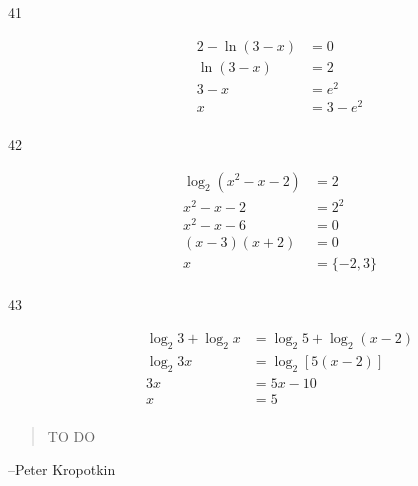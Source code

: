 \documentclass{exam}
\begin{document}
\begin{description}
      \item[41] 
        \begin{align*}
          2 - \ln(3 - x) &= 0 \\
          \ln(3 - x)     &= 2 \\
          3 - x          &= e^2 \\
          x              &= \boxed{3 - e^2} \\
        \end{align*}

      \item[42] 
        \begin{align*}
          \log_2(x^2 - x - 2) &= 2 \\
          x^2 - x - 2         &= 2^2 \\
          x^2 - x - 6         &= 0 \\
          (x - 3)(x + 2)      &= 0 \\
          x                   &= \boxed{\{ - 2, 3\}} \\
        \end{align*}

      \item[43] 
        \begin{align*}
          \log_2 3 + \log_2 x &= \log_2 5 + \log_2(x - 2) \\
          \log_2 3x           &= \log_2 [5 (x - 2)] \\
          3x                  &= 5x - 10 \\
          x                   &= \boxed{5} \\
        \end{align*}

    \end{description}

  \else
    \vspace{5 cm}
    \begin{quote}
      \begin{em}
        TO DO
      \end{em}
    \end{quote}

    \hspace{1 cm} --Peter Kropotkin
  \fi
\end{document}
